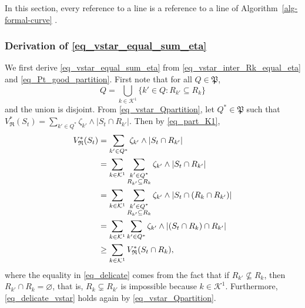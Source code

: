 \documentclass[
  11pt,
  a4paper,
]{article}
\theoremstyle{definition}
\theoremstyle{plain}
\theoremstyle{plain}
\theoremstyle{plain}
\theoremstyle{definition}
\theoremstyle{remark}
\begin{document}
In this section, every reference to a line is a reference to a line of
 Algorithm~\ref{alg-formal-curve} .

\subsubsection{\texorpdfstring{Derivation of
\eqref{eq_vstar_equal_sum_eta}}{Derivation of }}\label{derivation-of}

We first derive \eqref{eq_vstar_equal_sum_eta} from
\eqref{eq_vstar_inter_Rk_equal_eta} and \eqref{eq_Pt_good_partition}.
First note that for all \(Q\in\mathfrak P\), \begin{equation}
Q=\bigcup_{k\in\mathcal{K}^1}\{ k' \in Q : R_{k'}\subseteq R_k\}
\label{eq_part_K1}
\end{equation} and the union is disjoint. From
\eqref{eq_vstar_Qpartition}, let \(Q^*\in\mathfrak P\) such that
\(V^*_{\mathfrak{R}}(S_t) = \sum_{k'\in Q^*} \zeta_{k'}\wedge |S_t\cap R_{k'}|\).
Then by \eqref{eq_part_K1}, \begin{align}
V^*_{\mathfrak{R}}(S_t) &= \sum_{k'\in Q^*} \zeta_{k'}\wedge |S_t\cap R_{k'}|\notag\\
&=\sum_{k\in\mathcal{K}^1}  \sum_{\substack{k'\in Q^*\\ R_{k'}\subseteq R_k}} \zeta_{k'}\wedge |S_t\cap R_{k'}|\notag \\
&=\sum_{k\in\mathcal{K}^1}  \sum_{\substack{k'\in Q^*\\ R_{k'}\subseteq R_k}} \zeta_{k'}\wedge |S_t\cap (R_{k}\cap R_{k'})| \notag\\
&=\sum_{k\in\mathcal{K}^1}  \sum_{k'\in Q^*} \zeta_{k'}\wedge |(S_t\cap R_{k})\cap R_{k'}| \label{eq_delicate} \\
&\geq \sum_{k\in\mathcal{K}^1} V^*_{\mathfrak{R}}(S_t\cap R_k),\label{eq_delicate_vstar}
\end{align} where the equality in \eqref{eq_delicate} comes from the
fact that if \(R_{k'}\not\subseteq R_k\), then
\(R_{k'}\cap R_k=\varnothing\), that is, \(R_{k}\subsetneq R_{k'}\) is
impossible because \(k\in\mathcal K^1\). Furthermore,
\eqref{eq_delicate_vstar} holds again by \eqref{eq_vstar_Qpartition}.
\end{document}
